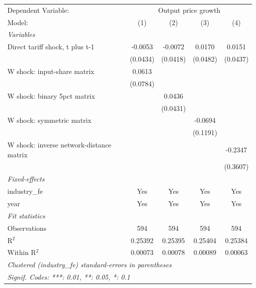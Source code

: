\begingroup
\centering
\begin{tabular}{lcccc}
   \tabularnewline \midrule \midrule
   Dependent Variable: & \multicolumn{4}{c}{Output price growth}\\
   Model:                                   & (1)      & (2)      & (3)      & (4)\\  
   \midrule
   \emph{Variables}\\
   Direct tariff shock, t plus t-1          & -0.0053  & -0.0072  & 0.0170   & 0.0151\\   
                                            & (0.0434) & (0.0418) & (0.0482) & (0.0437)\\   
   W shock: input-share matrix              & 0.0613   &          &          &   \\   
                                            & (0.0784) &          &          &   \\   
   W shock: binary 5pct matrix              &          & 0.0436   &          &   \\   
                                            &          & (0.0431) &          &   \\   
   W shock: symmetric matrix                &          &          & -0.0694  &   \\   
                                            &          &          & (0.1191) &   \\   
   W shock: inverse network-distance matrix &          &          &          & -0.2347\\   
                                            &          &          &          & (0.3607)\\   
   \midrule
   \emph{Fixed-effects}\\
   industry\_fe                             & Yes      & Yes      & Yes      & Yes\\  
   year                                     & Yes      & Yes      & Yes      & Yes\\  
   \midrule
   \emph{Fit statistics}\\
   Observations                             & 594      & 594      & 594      & 594\\  
   R$^2$                                    & 0.25392  & 0.25395  & 0.25404  & 0.25384\\  
   Within R$^2$                             & 0.00073  & 0.00078  & 0.00089  & 0.00063\\  
   \midrule \midrule
   \multicolumn{5}{l}{\emph{Clustered (industry\_fe) standard-errors in parentheses}}\\
   \multicolumn{5}{l}{\emph{Signif. Codes: ***: 0.01, **: 0.05, *: 0.1}}\\
\end{tabular}
\par\endgroup
